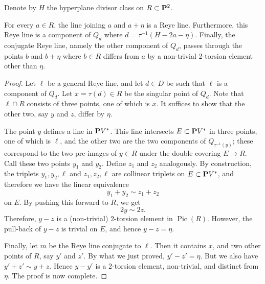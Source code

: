 \documentclass{amsart}
\renewcommand {\P}{{\bf P}}
\providecommand{\Pic}{\operatorname{Pic}}
\numberwithin{equation}{section}
\begin{document}
Denote by $H$ the hyperplane divisor class on $R \subset \P^2$.
\begin{lemma}\label{lem:reye}
  For every $a \in R$, the line joining $a$ and $a+\eta$ is a Reye line.
  Furthermore, this Reye line is a component of $Q_d$ where $d = \tau^{-1}(H-2a-\eta)$.
  Finally, the conjugate Reye line, namely the other component of $Q_d$, passes through the points $b$ and $b+\eta$ where $b \in R$ differs from $a$ by a non-trivial 2-torsion element other than $\eta$.
\end{lemma}
\begin{proof}
  Let $\ell$ be a general Reye line, and let $d \in D$ be such that $\ell$ is a component of $Q_d$.
  Let $x = \tau(d) \in R$ be the singular point of $Q_d$.
  Note that $\ell \cap R$ consists of three points, one of which is $x$.
  It suffices to show that the other two, say $y$ and $z$, differ by $\eta$.

  The point $y$ defines a line in $\P V^*$.
  This line intersects $E \subset \P V^*$ in three points, one of which is $\ell$, and the other two are the two components of $Q_{\tau^{-1}(y)}$; these correspond to the two pre-images of $y \in R$ under the double covering $E \to R$.
  Call these two points $y_1$ and $y_2$.
  Define $z_1$ and $z_2$ analogously.
  By construction, the triplets $y_1, y_2, \ell$ and $z_1, z_2, \ell$ are collinear triplets on $E \subset \P V^*$, and therefore we have the linear equivalence
  \[ y_1 + y_2 \sim z_1 + z_2\]
  on $E$.
  By pushing this forward to $R$, we get
  \[ 2y \sim 2z.\]
  Therefore, $y - z$ is a (non-trivial) 2-torsion element in $\Pic(R)$.
  However, the pull-back of $y-z$ is trivial on $E$, and hence $y - z = \eta$.

  Finally, let $m$ be the Reye line conjugate to $\ell$.
  Then it contains $x$, and two other points of $R$, say $y'$ and $z'$.
  By what we just proved, $y' - z' = \eta$.
  But we also have $y' + z' \sim y + z$.
  Hence $y - y'$ is a 2-torsion element, non-trivial, and distinct from $\eta$.
  The proof is now complete.  
\end{proof}
\end{document}
